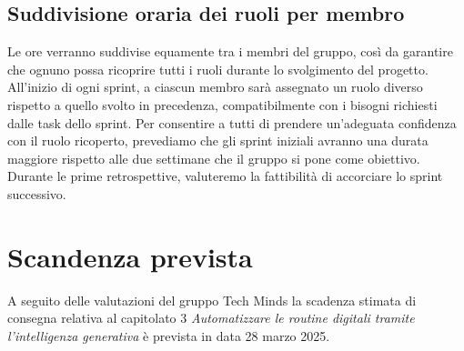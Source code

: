 \documentclass[10pt]{article}
\begin{document}
\subsection{Suddivisione oraria dei ruoli per membro}
Le ore verranno suddivise equamente tra i membri del gruppo, così da garantire che ognuno possa ricoprire tutti i ruoli durante lo svolgimento del progetto. All'inizio di ogni sprint, a ciascun membro sarà assegnato un ruolo diverso rispetto a quello svolto in precedenza, compatibilmente con i bisogni richiesti dalle task dello sprint. Per consentire a tutti di prendere un'adeguata confidenza con il ruolo ricoperto, prevediamo che gli sprint iniziali avranno una durata maggiore rispetto alle due settimane che il gruppo si pone come obiettivo. Durante le prime retrospettive, valuteremo la fattibilità di accorciare lo sprint successivo.

\section{Scandenza prevista}
A seguito delle valutazioni del gruppo Tech Minds la scadenza stimata di consegna relativa al capitolato 3 \textit{Automatizzare le routine digitali tramite l’intelligenza generativa} è prevista in data 28 marzo 2025.
\end{document}
